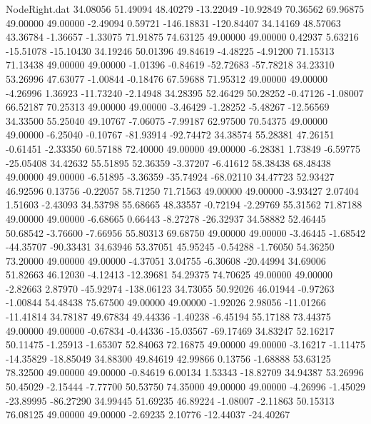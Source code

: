\begin{filecontents}{NodeRight.dat}
  34.08056   51.49094   48.40279   -13.22049  -10.92849   70.36562   69.96875   49.00000   49.00000   -2.49094    0.59721 -146.18831 -120.84407
  34.14169   48.57063   43.36784    -1.36657   -1.33075   71.91875   74.63125   49.00000   49.00000    0.42937    5.63216  -15.51078  -15.10430
  34.19246   50.01396   49.84619    -4.48225   -4.91200   71.15313   71.13438   49.00000   49.00000   -1.01396   -0.84619  -52.72683  -57.78218
  34.23310   53.26996   47.63077    -1.00844   -0.18476   67.59688   71.95312   49.00000   49.00000   -4.26996    1.36923  -11.73240   -2.14948
  34.28395   52.46429   50.28252    -0.47126   -1.08007   66.52187   70.25313   49.00000   49.00000   -3.46429   -1.28252   -5.48267  -12.56569
  34.33500   55.25040   49.10767    -7.06075   -7.99187   62.97500   70.54375   49.00000   49.00000   -6.25040   -0.10767  -81.93914  -92.74472
  34.38574   55.28381   47.26151    -0.61451   -2.33350   60.57188   72.40000   49.00000   49.00000   -6.28381    1.73849   -6.59775  -25.05408
  34.42632   55.51895   52.36359    -3.37207   -6.41612   58.38438   68.48438   49.00000   49.00000   -6.51895   -3.36359  -35.74924  -68.02110
  34.47723   52.93427   46.92596     0.13756   -0.22057   58.71250   71.71563   49.00000   49.00000   -3.93427    2.07404    1.51603   -2.43093
  34.53798   55.68665   48.33557    -0.72194   -2.29769   55.31562   71.87188   49.00000   49.00000   -6.68665    0.66443   -8.27278  -26.32937
  34.58882   52.46445   50.68542    -3.76600   -7.66956   55.80313   69.68750   49.00000   49.00000   -3.46445   -1.68542  -44.35707  -90.33431
  34.63946   53.37051   45.95245    -0.54288   -1.76050   54.36250   73.20000   49.00000   49.00000   -4.37051    3.04755   -6.30608  -20.44994
  34.69006   51.82663   46.12030    -4.12413  -12.39681   54.29375   74.70625   49.00000   49.00000   -2.82663    2.87970  -45.92974 -138.06123
  34.73055   50.92026   46.01944    -0.97263   -1.00844   54.48438   75.67500   49.00000   49.00000   -1.92026    2.98056  -11.01266  -11.41814
  34.78187   49.67834   49.44336    -1.40238   -6.45194   55.17188   73.44375   49.00000   49.00000   -0.67834   -0.44336  -15.03567  -69.17469
  34.83247   52.16217   50.11475    -1.25913   -1.65307   52.84063   72.16875   49.00000   49.00000   -3.16217   -1.11475  -14.35829  -18.85049
  34.88300   49.84619   42.99866     0.13756   -1.68888   53.63125   78.32500   49.00000   49.00000   -0.84619    6.00134    1.53343  -18.82709
  34.94387   53.26996   50.45029    -2.15444   -7.77700   50.53750   74.35000   49.00000   49.00000   -4.26996   -1.45029  -23.89995  -86.27290
  34.99445   51.69235   46.89224    -1.08007   -2.11863   50.15313   76.08125   49.00000   49.00000   -2.69235    2.10776  -12.44037  -24.40267

\end{filecontents}
